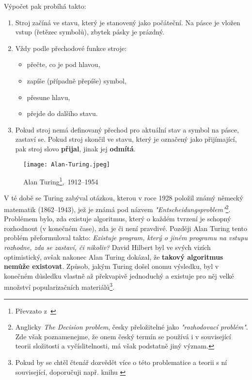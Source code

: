 Výpočet pak probíhá takto:
\begin{enumerate}
    \item Stroj začíná ve stavu, který je stanovený jako počáteční. Na pásce je vložen vstup (řetězec symbolů), zbytek pásky je prázdný.
    \item Vždy podle přechodové funkce stroje:
    \begin{itemize}
        \item přečte, co je pod hlavou,
        \item zapíše (případně přepíše) symbol,
        \item přesune hlavu,
        \item přejde do dalšího stavu.
    \end{itemize}
    \item Pokud stroj nemá definovaný přechod pro aktuální stav a symbol na pásce, zastaví se. Pokud stroj skončil ve stavu, který je označený jako přijímající, pak stroj slovo \textbf{přijal}, jinak jej \textbf{odmítá}.
\end{enumerate}
\begin{figure}[h]
    \centering
    \texttt{[image: Alan-Turing.jpeg]}
    \caption[Alan Turing,~1871--1956]{Alan Turing\footnote{Převzato z~\cite{OConnorTuring2025}},~1912--1954}
    \label{fig:alan-turing}
\end{figure}
V té době se Turing zabýval otázkou, kterou v roce 1928 položil známý německý matematik  (1862--1943), jež je známá pod názvem \emph{"Entscheidungsproblem"}\footnote{Anglicky \emph{The Decision problem}, česky přeložitelné jako \emph{"rozhodovací problém"}. Zde však poznamenejme, že onem český termín se používá i v související teorii složitosti a vyčíslitelnosti, má však podstatně jiný význam.}. Problémem bylo, zda existuje algoritmus, který o každém tvrzení je schopný rozhodnout (v konečném čase), zda je či není pravdivé. Později Alan Turing tento problém přeformuloval takto: \emph{Existuje program, který o jiném programu na vstupu rozhodne, zda se zastaví, či nikoliv?} David Hilbert byl ve svých vizích optimistický, avšak nakonec Alan Turing dokázal, že \textbf{takový algoritmus nemůže existovat}. Způsob, jakým Turing došel onomu výsledku, byl v konečném důsledku vlastně až překvapivě jednoduchý a existuje pro něj velké množství popularizačních materiálů\footnote{Pokud by se chtěl čtenář dozvědět více o této problematice a teorii s ní související, doporučuji např. knihu \cite{Motwani2003}}.
